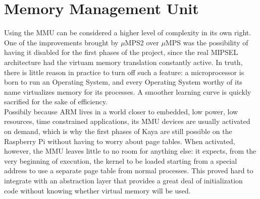 \documentclass[12pt,a4paper,openright,twoside]{report}
\begin{document}
\section{Memory Management Unit}
\label{halmmu}
Using the MMU can be considered a higher level of complexity in its own right.
One of the improvements brought by $\mu$MPS2 over $\mu$MPS was the possibility 
of having it disabled for the first phases of the project, since the real 
MIPSEL architecture had the virtuam memory translation constantly active.
In truth, there is little reason in practice to turn off such a feature: a microprocessor
is born to run an Operating System, and every Operating System worthy of its name
virtualizes memory for its processes. A smoother learning curve is quickly 
sacrified for the sake of efficiency.\\
Possibily because ARM lives in a world closer to embedded, low power, low resources,
time constrained applications, its MMU devices are usually activated on demand,
which is why the first phases of Kaya are still possible on the Raspberry Pi 
without having to worry about page tables.
When activated, however, the MMU leaves little to no room for anything else: it 
expects, from the very beginning of execution,
 the kernel to be loaded starting from a special address to use a separate
page table from normal processes. This proved hard to integrate with an abstraction
layer that provides a great deal of initialization code without knowing whether
virtual memory will be used.
\end{document}
